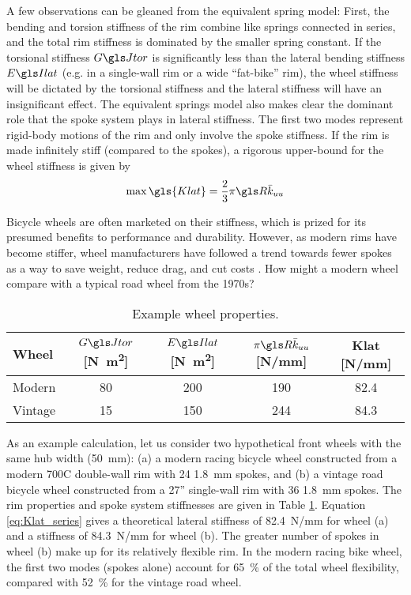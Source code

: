 \documentclass[\rootdir/thesis.tex]{subfiles}
\begin{document}
A few observations can be gleaned from the equivalent spring model: First, the bending and torsion stiffness of the rim combine like springs connected in series, and the total rim stiffness is dominated by the smaller spring constant. If the torsional stiffness $\GJ$ is significantly less than the lateral bending stiffness $\EIl$ (e.g. in a single-wall rim or a wide ``fat-bike'' rim), the wheel stiffness will be dictated by the torsional stiffness and the lateral stiffness will have an insignificant effect. The equivalent springs model also makes clear the dominant role that the spoke system plays in lateral stiffness. The first two modes represent rigid-body motions of the rim and only involve the spoke stiffness. If the rim is made infinitely stiff (compared to the spokes), a rigorous upper-bound for the wheel stiffness is given by
\begin{equation}
\label{eq:Klat_stiff_rim}
\max{\gls{Klat}} = \frac{2}{3} \pi \R \kuu
\end{equation}

Bicycle wheels are often marketed on their stiffness, which is prized for its presumed benefits to performance and durability. However, as modern rims have become stiffer, wheel manufacturers have followed a trend towards fewer spokes as a way to save weight, reduce drag, and cut costs \cite{Brown2011}. How might a modern wheel compare with a typical road wheel from the 1970s?

\begin{table}[h]
\caption[Example lateral stiffness properties]{Example wheel properties.\label{tab:wheels}}
\begin{threeparttable}
\begin{tabular}{lcccc}
\toprule
\bf{Wheel} & $\GJ$ [\si{N.m^2}]& $\EIl$ [\si{N.m^2}] & $\pi\R\kuu$ [\si{N/mm}] & \gls{Klat} [\si{N/mm}]\\
\midrule
Modern  & 80 & 200 & 190 & 82.4\\
Vintage & 15 & 150 & 244 & 84.3\\
\bottomrule
\end{tabular}
\end{threeparttable}
\end{table}

As an example calculation, let us consider two hypothetical front wheels with the same hub width (\SI{50}{mm}): (a) a modern racing bicycle wheel constructed from a modern 700C double-wall rim with 24 \SI{1.8}{mm} spokes, and (b) a vintage road bicycle wheel constructed from a 27'' single-wall rim with 36 \SI{1.8}{mm} spokes. The rim properties and spoke system stiffnesses are given in Table \ref{tab:wheels}. Equation \eqref{eq:Klat_series} gives a theoretical lateral stiffness of \SI{82.4}{N/mm} for wheel (a) and a stiffness of \SI{84.3}{N/mm} for wheel (b). The greater number of spokes in wheel (b) make up for its relatively flexible rim. In the modern racing bike wheel, the first two modes (spokes alone) account for \SI{65}{\percent} of the total wheel flexibility, compared with \SI{52}{\percent} for the vintage road wheel.
\end{document}
